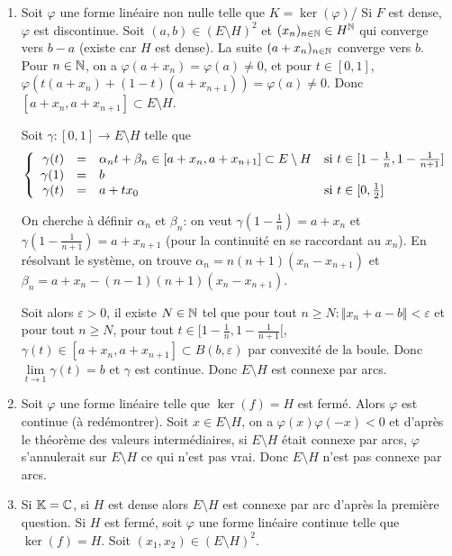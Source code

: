 \begin{solution}
	\phantom{}
	\begin{enumerate}
		\item Soit $\varphi$ une forme linéaire non nulle telle que $K=\ker(\varphi)$/ Si $F$ est dense, $\varphi$ est discontinue. Soit $(a,b)\in(E\setminus H)^{2}$ et $(x_{n})_{n\in\mathbb{N}}\in H^{\mathbb{N}}$ qui converge vers $b-a$ (existe car $H$ est dense). La suite $(a+x_{n})_{n\in\mathbb{N}}$ converge vers $b$. Pour $n\in\mathbb{N}$, on a $\varphi(a+x_{n})=\varphi(a)\neq0$, et pour $t\in[0,1]$, $\varphi(t(a+x_{n})+(1-t)(a+x_{n+1}))=\varphi(a)\neq0$. Donc $[a+x_{n},a+x_{n+1}]\subset E\setminus H$.
		
		Soit $\gamma:[0,1]\to E\setminus H$ telle que 
		$$
		\left\{
			\begin{array}[]{rcll}
				\gamma(t) & = &\alpha_{n}t+\beta_{n}\in[a+x_{n},a+x_{n+1}]\subset E\setminus H &\text{si }t\in[1-\frac{1}{n},1-\frac{1}{n+1}]\\
				\gamma(1) & = &b&\\
				\gamma(t) &= & a+tx_{0}&\text{si }t\in[0,\frac{1}{2}]
			\end{array}
		\right.
		$$

		On cherche à définir $\alpha_{n}$ et $\beta_{n}$: on veut $\gamma(1-\frac{1}{n})=a+x_{n}$ et $\gamma(1-\frac{1}{n+1})=a+x_{n+1}$ (pour la continuité en se raccordant au $x_{n}$). En résolvant le système, on trouve $\alpha_{n}=n(n+1)(x_{n}-x_{n+1})$ et $\beta_{n}=a+x_{n}-(n-1)(n+1)(x_{n}-x_{n+1})$.

		Soit alors $\varepsilon>0$, il existe $N\in\mathbb{N}$ tel que pour tout $n\geqslant N\colon\Vert x_{n}+a-b\Vert<\varepsilon$ et pour tout $n\geqslant N$, pour tout $t\in[1-\frac{1}{n},1-\frac{1}{n+1}[$, $\gamma(t)\in[a+x_{n},a+x_{n+1}]\subset B(b,\varepsilon)$ par convexité de la boule. Donc $\lim\limits_{t\to 1}\gamma(t)=b$ et $\gamma$ est continue. Donc $E\setminus H$ est connexe par arcs.

		\item Soit $\varphi$ une forme linéaire telle que $\ker(f)=H$ est fermé. Alors $\varphi$ est continue (à redémontrer). Soit $x\in E\setminus H$, on a $\varphi(x)\varphi(-x)<0$ et d'après le théorème des valeurs intermédiaires, si $E\setminus H$ était connexe par arcs, $\varphi$ s'annulerait sur $E\setminus H$ ce qui n'est pas vrai. Donc $E\setminus H$ n'est pas connexe par arcs.
		
		\item Si $\mathbb{K}=\mathbb{C}$, si $H$ est dense alors $E\setminus H$ est connexe par arc d'après la première question. Si $H$ est fermé, soit $\varphi$ une forme linéaire continue telle que $\ker(f)=H$. Soit $(x_{1},x_{2})\in(E\setminus H)^{2}$. 
		

\end{enumerate}
\end{solution}
